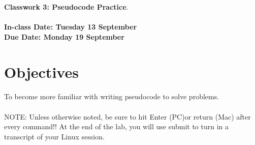 \documentclass[letter,11pt]{article}
\begin{document}
\huge
\textbf{Classwork 3: Pseudocode Practice}.
\normalsize
\\ ~~ \\
\textbf{In-class Date: Tuesday 13 September} \\
\textbf{Due Date: Monday 19 September}

\section*{Objectives}
\paragraph{}To become more familiar with writing pseudocode to solve problems.
\paragraph{}NOTE: Unless otherwise noted, be sure to hit Enter (PC)or return (Mac) after every command!! At the end of the lab, you will use submit to turn in a transcript of your Linux session. %
\end{document}
